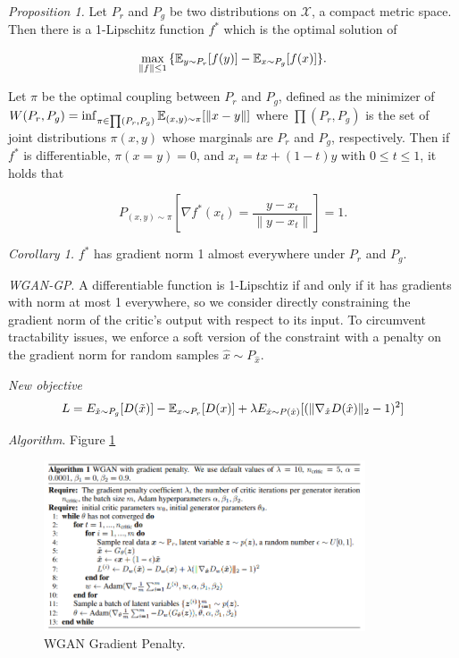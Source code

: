 \documentclass[english]{article}
\begin{document}
\item {\emph{Proposition 1.}}
Let $P_r$ and $P_g$ be two distributions on $\mathcal{X}$, a compact metric space. Then there is a 1-Lipschitz function $f^*$ which is the optimal solution of 

$$\max_{\|f\|\le 1} {\{\mathbb{E}_{y\sim P_r}[f(y)]-\mathbb{E}_{x\sim P_g}[f(x)]\}}.$$ 

Let $\pi$ be the optimal coupling between $P_r$ and $P_g$, defined as the minimizer of $W(P_r,P_g)=\inf_{\pi\in \prod(P_r,P_g)}\mathbb{E}_{(x,y)\sim\pi}[\|x-y\|]$ where $\prod(P_r,P_g)$ is the set of joint distributions $\pi(x,y)$ whose marginals are $P_r$ and $P_g$, respectively. Then if $f^*$ is differentiable, $\pi(x=y)=0$, and $x_t=tx+(1-t)y$ with $0\le t\le 1$, it holds that 

$$P_{(x,y)\sim\pi}[\nabla f^*(x_t)=\frac{y-x_t}{\|y-x_t\|}]=1.$$ 




\item {\emph{Corollary 1.}}
$f^*$ has gradient norm 1 almost everywhere under $P_r$ and $P_g$.




\item {\emph{WGAN-GP}}.
 A differentiable function is 1-Lipschtiz if and only if it has gradients with norm at most 1 everywhere, so we consider directly constraining the gradient norm of the critic's output with respect to its input. To circumvent tractability issues, we enforce a soft version of the constraint with a penalty on the gradient norm for random samples $\hat{x}\sim P_{\hat{x}}$.




\item {\emph{New objective}}
$$L=E_{\Tilde{x}\sim P_g}[D(\Tilde{x})]-\mathbb{E}_{x\sim P_r}[D(x)]+\lambda E_{\hat{x}\sim P(\hat{x})}[(\|\nabla_{\hat{x}}D(\hat{x})\|_2 -1)^2]$$





\item {\emph{Algorithm}}. Figure \ref{wgan_gp}
\begin{figure}[h!]
  \centering
  \includegraphics[width=0.85\textwidth]{WGAN_GP.png}
    \caption{WGAN Gradient Penalty.}
  \label{wgan_gp}
 \end{figure}
\end{document}
